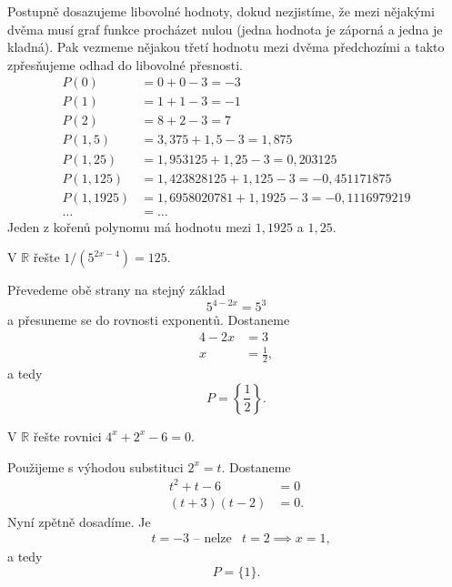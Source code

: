 \begin{reseni}
Postupně dosazujeme libovolné hodnoty, dokud nezjistíme, že mezi nějakými dvěma
musí graf funkce procházet nulou (jedna hodnota je záporná a jedna je kladná). Pak vezmeme nějakou třetí hodnotu mezi dvěma předchozími a takto zpřesňujeme odhad do libovolné přesnosti.
\begin{align*}
	P(0) &= 0 + 0 -3 = -3\\
	P(1) &= 1+ 1 -3 = -1\\
	P(2) &= 8 + 2 - 3 = 7\\
	P(1{,}5) &= 3{,}375 + 1{,}5 - 3 = 1{,}875\\
	P(1{,}25) &= 1{,}953125 + 1{,}25 - 3 = 0{,}203125\\
	P(1{,}125) &= 1{,}423828125 + 1{,}125 -3 = -0{,}451171875\\
	P(1{,}1925) &= 1{,}6958020781 + 1{,}1925 - 3 = -0{,}1116979219\\
	\dots &= \dots
\end{align*}
Jeden z kořenů polynomu má hodnotu mezi $1{,}1925$ a $1{,}25$.
\end{reseni}

\begin{priklad}
V $\mathbb R$ řešte $1/(5^{2x-4})=125.$
\end{priklad}

\begin{reseni}
Převedeme obě strany na stejný základ
$$5^{4-2x}=5^3$$
a přesuneme se do rovnosti exponentů. Dostaneme
\begin{align*}
	4-2x&=3\\
	x&=\frac{1}{2},
\end{align*}
a tedy
$$
P=\left \{ \frac{1}{2} \right \}.
$$
\end{reseni}

\begin{priklad}
V $\mathbb R$ řešte rovnici $4^x+2^x-6=0$.
\end{priklad}

\begin{reseni}
Použijeme s výhodou substituci $2^x=t$. Dostaneme
\begin{align*}
t^2+t-6&=0\\
(t+3)(t-2)&=0.
\end{align*}
Nyní zpětně dosadíme. Je
\begin{align*}
	&t=-3 \text{ -- nelze} &t=2 \implies x = 1,
\end{align*}
a tedy
$$P=\{1\}.$$
\end{reseni}

